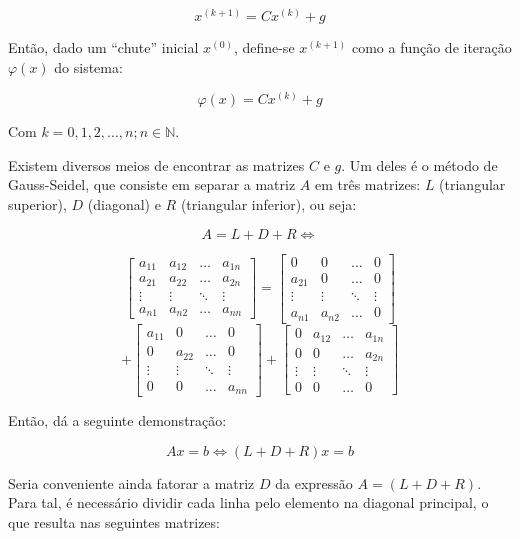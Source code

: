 \documentclass[twocolumn, 10pt,a4paper]{extarticle}
\begin{document}
\[
x^{(k+1)} = Cx^{(k)}+g
\]

Então, dado um ``chute'' inicial $x^{(0)}$, define-se $x^{(k+1)}$ como a função de iteração $\varphi(x)$ do sistema:

\[
\varphi(x) = Cx^{(k)}+g
\]

Com $k = 0, 1, 2, \dots, n; n \in \mathbb{N} $.

Existem diversos meios de encontrar as matrizes $C$ e $g$. Um deles é o método de Gauss-Seidel, que consiste em separar a matriz $A$ em três matrizes: $L$ (triangular superior), $D$ (diagonal) e $R$ (triangular inferior), ou seja:

\[A = L + D + R \iff\]

\[
\begin{bmatrix}
a_{11} & a_{12} & \dots & a_{1n} \\
a_{21} & a_{22} & \dots & a_{2n} \\
\vdots & \vdots & \ddots & \vdots \\
a_{n1} & a_{n2} & \dots & a_{nn}  
\end{bmatrix}
=
\begin{bmatrix}
0 & 0 & \dots & 0 \\
a_{21} & 0 & \dots & 0 \\
\vdots & \vdots & \ddots & \vdots \\
a_{n1} & a_{n2} & \dots & 0  
\end{bmatrix}
\]
\[
+
\begin{bmatrix}
a_{11} & 0 & \dots & 0 \\
0 & a_{22} & \dots & 0 \\
\vdots & \vdots & \ddots & \vdots \\
0 & 0 & \dots & a_{nn}  
\end{bmatrix}
+
\begin{bmatrix}
0 & a_{12} & \dots & a_{1n} \\
0 & 0 & \dots & a_{2n} \\
\vdots & \vdots & \ddots & \vdots \\
0 & 0 & \dots & 0 
\end{bmatrix}
\]

Então, \cite[p. 164]{ruggiero} dá a seguinte demonstração:

\[
Ax = b \iff (L + D + R)x = b
\]

Seria conveniente ainda fatorar a matriz $D$ da expressão $A = (L + D + R)$. Para tal, é necessário dividir cada linha pelo elemento na diagonal principal, o que resulta nas seguintes matrizes:
\end{document}
